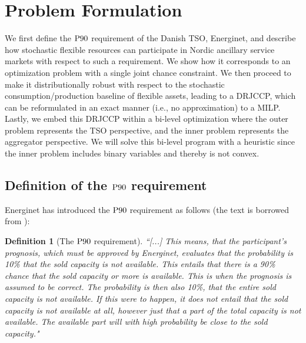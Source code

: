 \documentclass[conference]{IEEEtran}
\newtheorem{definition}{Definition} %
\begin{document}
\section{Problem Formulation}\label{sec:problem-formulation}
\vspace{-1mm}
We first define the $\rm{P90}$ requirement of the Danish TSO, Energinet, and describe how stochastic flexible resources can participate in Nordic ancillary service markets with respect to such a requirement. We show how it corresponds to an optimization problem with a single joint chance constraint. We then proceed to make it distributionally robust with respect to the stochastic consumption/production baseline of  flexible assets, leading to a  \ac{DRJCCP}, which can be  reformulated in an exact manner (i.e., no approximation) to a \ac{MILP}. Lastly, we embed this \ac{DRJCCP} within a bi-level optimization where the outer problem represents the \ac{TSO} perspective, and the inner problem represents the aggregator perspective. We will solve this bi-level program with a heuristic since the inner problem includes binary variables and thereby is not convex. 

\vspace{2mm}
\subsection{Definition of the $\rm{P90}$ requirement}
\vspace{-1mm}
Energinet has introduced the $\rm{P90}$ requirement as follows (the text is borrowed from \cite{energinet}): 
%
%
\begin{definition}[The $\rm{P90}$ requirement]\label{def:P90}
    \textit{``[...] This means, that the participant's prognosis, which must be approved by Energinet, evaluates that the probability is 10\% that the sold capacity is not available. This entails that there is a 90\% chance that the sold capacity or more is available. This is when the prognosis is assumed to be correct.
    The probability is then also 10\%, that the entire sold capacity is not available. If this were to happen, it does not entail that the sold capacity is not available at all, however just that a part of the total capacity is not available. The available part will with high probability be close to the sold capacity."}
\end{definition}
\end{document}
